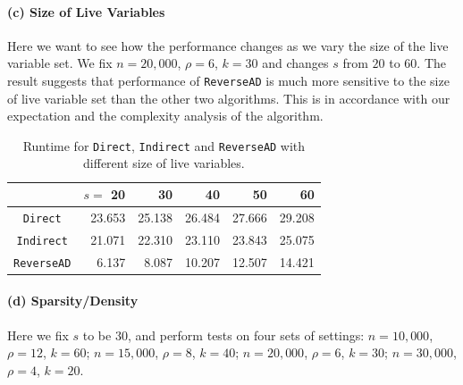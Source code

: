 \documentclass[11pt, twocolumn]{article}
\begin{document}
\paragraph{(c) Size of Live Variables} 
Here we want to see how the performance changes as we vary the size of the live variable set.
We fix $n = 20,000$, $\rho = 6$, $k = 30$ and changes $s$ from $20$ to $60$. The result suggests that performance of {\tt ReverseAD} is much more sensitive to the size of live variable set than the other two algorithms. This is in accordance with our expectation and the complexity analysis of the algorithm.
\begin{table}[htbp]
\begin{center}
\begin{tabular}{ | c | r | r | r | r | r |}
\hline
& $s=$ 20 & 30 & 40 & 50 & 60 \\
\hline
{\tt Direct} & 23.653 & 25.138 & 26.484 & 27.666 & 29.208\\
{\tt Indirect} & 21.071 & 22.310 & 23.110 & 23.843 & 25.075\\
{\tt ReverseAD} & 6.137 & 8.087 & 10.207 & 12.507 & 14.421\\
\hline 
\end{tabular}
\caption{Runtime for {\tt Direct}, {\tt Indirect} and {\tt ReverseAD} with different size of live variables.}
\label{tab:live}
\end{center}
\end{table}

\paragraph{(d) Sparsity/Density} 
Here we fix $s$ to be  $30$, and perform tests on four sets of settings: 
\newline $n=10,000$, $\rho = 12$, $k=60$; 
\newline $n=15,000$, $\rho = 8$, $k=40$; 
\newline $n=20,000$, $\rho=6$, $k=30$; 
\newline $n=30,000$, $\rho=4$, $k=20$. 
\end{document}
